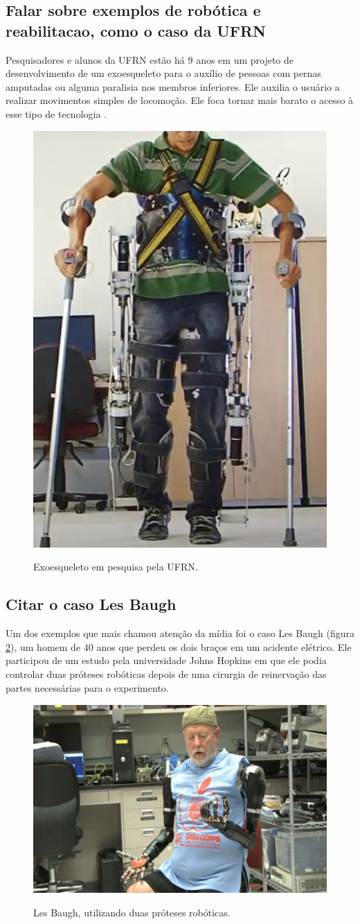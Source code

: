 \documentclass[12pt,a4paper]{article}
\begin{document}
    \subsection{Falar sobre exemplos de robótica e reabilitacao, como o caso da UFRN}
    Pesquisadores e alunos da UFRN estão há 9 anos em um projeto de desenvolvimento de um exoesqueleto para o auxílio de pessoas com pernas amputadas ou alguma paralisia nos membros inferiores. Ele auxilia o usuário a realizar movimentos simples de locomoção. Ele foca tornar mais barato o acesso à esse tipo de tecnologia \cite{8}.
    \begin{figure}[ht]
        \caption{Exoesqueleto em pesquisa pela UFRN. \cite{8}}
        \centering
        \includegraphics[width=0.6\linewidth]
        {images/exoesq.png}
        \label{fig:les}
    \end{figure}

    \subsection{Citar o caso Les Baugh}
    Um dos exemplos que mais chamou atenção da mídia foi o caso Les Baugh (figura \ref{fig:les}), um homem de 40 anos que perdeu os dois braços em um acidente elétrico. Ele participou de um estudo pela universidade Johns Hopkins em que ele podia controlar duas próteses robóticas depois de uma cirurgia de reinervação das partes necessárias para o experimento.
    \begin{figure}[ht]
        \caption{Les Baugh, utilizando duas próteses robóticas. \cite{6}}
        \centering
        \includegraphics[width=0.6\linewidth]
        {images/Les.png}
        \label{fig:les}
    \end{figure}
\end{document}

